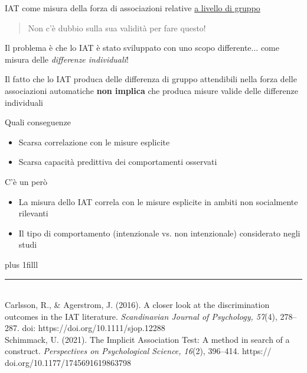 \documentclass[compress]{beamer}
\begin{document}
\begin{frame}
	IAT come misura della forza di associazioni relative \underline{a livello di gruppo}
	
	\vspace{1.5mm}
	\begin{quote}
		Non c'è dubbio sulla sua validità per fare questo!
	\end{quote}
	
	\vspace{1.5mm}
	
	Il problema è che lo IAT è stato sviluppato con uno scopo differente... come misura delle \emph{differenze individuali}!
	
	\vspace{1.5mm}
	
	Il fatto che lo IAT produca delle differenza di gruppo attendibili nella forza delle associazioni automatiche  \textbf{non implica} che produca misure valide delle differenze individuali
	
	
\end{frame}

\begin{frame}{Quali conseguenze}
	\begin{itemize}
		\item Scarsa correlazione con le misure esplicite
		\vspace{1.5mm}
		\item Scarsa capacità predittiva dei comportamenti osservati 
	\end{itemize}
	
	\pause
\begin{center}
C'è un però
\end{center}

\begin{itemize}
	\item La misura dello IAT correla con le misure esplicite in ambiti non socialmente rilevanti 
	\item Il tipo di comportamento (intenzionale vs. non intenzionale) considerato negli studi 
\end{itemize}

\vskip0pt plus 1filll

\color{template}\rule{0.30\linewidth}{0.5pt}\\
\color{black}
\footnotesize{Carlsson, R., \& Agerstrom, J. (2016). A closer look at the discrimination outcomes in the IAT literature. \emph{Scandinavian Journal of Psychology, 57}(4), 278–287. doi:
	https://doi.org/10.1111/sjop.12288\\
	Schimmack, U. (2021). The Implicit Association Test:
	A method in search of a construct. \emph{Perspectives on
		Psychological Science, 16}(2), 396–414. https://
	doi.org/10.1177/1745691619863798}
\end{frame}
\end{document}
